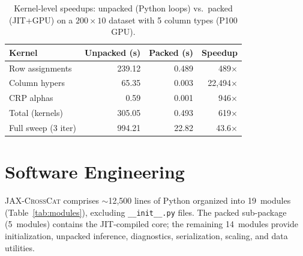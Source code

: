 \documentclass[11pt]{article}
\newcommand{\jaxcc}{\textsc{JAX-CrossCat}}
\begin{document}
\begin{table}[!htb]
\centering
\caption{Kernel-level speedups: unpacked (Python loops) vs.\ packed
  (JIT+GPU) on a $200 \times 10$ dataset with 5 column types (P100 GPU).}
\label{tab:kernel_speedup}
\begin{tabular}{lrrr}
\toprule
Kernel & Unpacked (s) & Packed (s) & Speedup \\
\midrule
Row assignments    & 239.12 & 0.489 & 489$\times$ \\
Column hypers      & 65.35  & 0.003 & 22,494$\times$ \\
CRP alphas         & 0.59   & 0.001 & 946$\times$ \\
\midrule
Total (kernels)    & 305.05 & 0.493 & 619$\times$ \\
Full sweep (3 iter) & 994.21 & 22.82 & 43.6$\times$ \\
\bottomrule
\end{tabular}
\end{table}

\section{Software Engineering}
\label{sec:software}

\jaxcc{} comprises ${\sim}$12,500 lines of Python organized into
19~modules (Table~\ref{tab:modules}), excluding \texttt{\_\_init\_\_.py}
files. The packed sub-package (5~modules) contains the JIT-compiled
core; the remaining 14~modules provide initialization, unpacked
inference, diagnostics, serialization, scaling, and data utilities.
\end{document}
